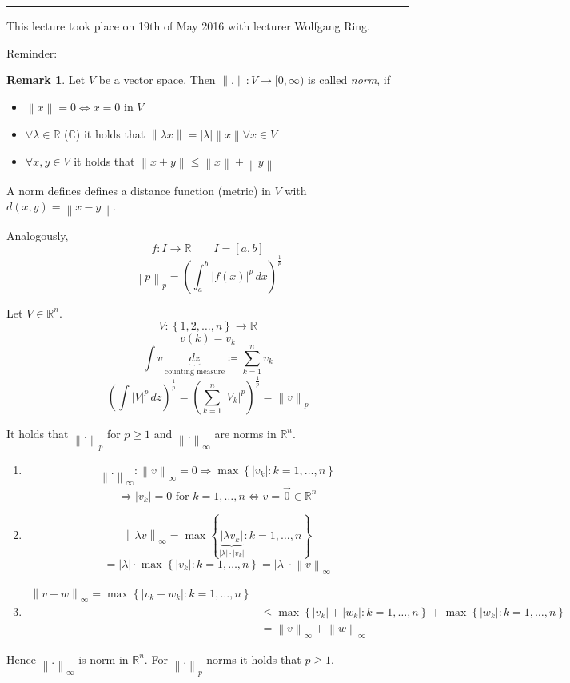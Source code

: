 \documentclass[a4paper,landscape,twocolumn]{article}
\theoremstyle{definition}
\newtheorem{rem}{Remark}
\newcommand\set[1]{\left\{#1\right\}}
\newcommand\abs[1]{\left|#1\right|}
\newcommand\meta[3]{\hrule{} This #1 took place on #2 with lecturer #3.\par}
\newcommand\norm[1]{\left\|#1\right\|}
\newcommand\inorm[1]{\left\|#1\right\|_\infty}
\begin{document}
\meta{lecture}{19th of May 2016}{Wolfgang Ring}

Reminder:
\begin{rem}
  Let $V$ be a vector space. Then $\|.\|: V \to [0,\infty)$ is called \emph{norm}, if
  \begin{itemize}
    \item $\norm{x} = 0 \Leftrightarrow x = 0$ in $V$
    \item $\forall \lambda \in \mathbb R$ ($\mathbb C$) it holds that $\norm{\lambda x} = \abs{\lambda} \norm{x} \forall x \in V$
    \item $\forall x,y \in V$ it holds that $\norm{x + y} \leq \norm{x} + \norm{y}$
  \end{itemize}
  A norm defines defines a distance function (metric) in $V$ with $d(x,y) = \norm{x - y}$.

  Analogously,
  \[ f: I \to \mathbb R \qquad I = [a,b] \]
  \[ \norm{p}_p = \left(\int_a^b \abs{f(x)}^p \, dx\right)^{\frac1p} \]

  Let $V \in \mathbb R^n$.
  \[ V: \set{1, 2, \ldots, n} \to \mathbb R \]
  \[ v(k) = v_k \]
  \[ \int v \, \underbrace{dz}_{\text{counting measure}} \coloneqq \sum_{k=1}^{n} v_k \]
  \[
    \left(\int \abs{V}^p \, dz\right)^{\frac1p}
    = \left(\sum_{k=1}^n \abs{V_k}^p\right)^{\frac1p}
    = \norm{v}_p
  \]

  It holds that $\norm{.}_p$ for $p \geq 1$ and $\inorm{.}$ are norms in $\mathbb R^n$.

  \begin{enumerate}
    \item
      \[ \inorm{.}: \inorm{v} = 0 \Rightarrow \max\set{\abs{v_k}: k = 1, \ldots, n} \]
      \[ \Rightarrow \abs{v_k} = 0 \text{ for } k = 1, \ldots, n \Leftrightarrow v = \vec{0} \in \mathbb R^n \]
    \item
      \[ \inorm{\lambda v} = \max\set{\underbrace{\abs{\lambda v_k}}_{\abs{\lambda} \cdot \abs{v_k}}: k = 1, \ldots, n} \]
      \[ = \abs{\lambda} \cdot \max\set{\abs{v_k}: k = 1, \ldots, n} = \abs{\lambda} \cdot \inorm{v} \]
    \item
      \begin{align*}
        \inorm{v + w} = \max\set{\abs{v_k + w_k}: k = 1, \ldots, n} \\
            &\leq \max\set{\abs{v_k} + \abs{w_k}: k = 1, \ldots, n} + \max\set{\abs{w_k}: k = 1, \ldots, n} \\
            &= \inorm{v} + \inorm{w}
      \end{align*}
  \end{enumerate}
  Hence $\inorm{.}$ is norm in $\mathbb R^n$.
  For $\norm{.}_p$-norms it holds that $p \geq 1$.


\end{rem}
\end{document}
